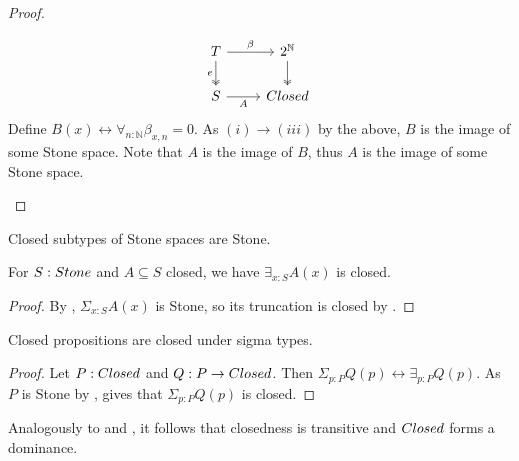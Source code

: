 \begin{proof}
\begin{itemize}
     \[
       \begin{tikzcd}
         T \arrow[r,"\beta"] \arrow[d, two heads,swap,"e"] & 2^\mathbb N 
         \arrow[d,two heads] \\
         S \arrow[r,swap,"A"] & \Closed
       \end{tikzcd} 
     \] 
     Define $B(x) \leftrightarrow \forall_{n:\mathbb N} \beta_{x,n} = 0$. 
     As $(i) \to (iii)$ by the above, $B$ is the image of some Stone space. 
     Note that $A$ is the image of $B$, 
     thus $A$ is the image of some Stone space. 
     \end{itemize} 
     \end{proof} 

\begin{corollary}\label{ClosedInStoneIsStone}
Closed subtypes of Stone spaces are Stone.
\end{corollary}

\begin{corollary}\label{InhabitedClosedSubSpaceClosed}
  For $S:\Stone$ and $A\subseteq S$ closed, we have 
  $\exists_{x:S} A(x)$ is closed. 
\end{corollary}
\begin{proof}
  By , $\Sigma_{x:S}A(x)$ is Stone, 
  so its truncation is closed by .
\end{proof}

\begin{corollary}\label{ClosedDependentSums}
  Closed propositions are closed under sigma types. 
\end{corollary}
\begin{proof}
  Let $P:\Closed$ and $Q:P \to \Closed$. 
  Then $\Sigma_{p:P} Q(p) \leftrightarrow \exists_{p:P} Q(p)$.
  As $P$ is Stone by , 
   gives that $\Sigma_{p:P} Q(p)$ is closed. 
\end{proof}
\begin{remark}\label{ClosedDominance}\label{ClosedTransitive}
  Analogously to  and , it follows that 
  closedness is transitive and $\Closed$ forms a dominance. 
\end{remark}



